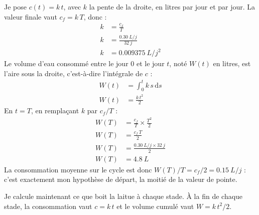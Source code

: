 \begin{demonstration}
Je pose $c(t) = k\,t$, avec $k$ la pente de la droite, en litres par jour et par jour. La valeur finale vaut $c_f = k\,T$, donc :
\begin{align*}
k &= \frac{c_f}{T}\\
k &= \frac{\qty{0,30}{L/j}}{\qty{32}{j}}\\
k &= \qty{0,009375}{L/j^2}
\end{align*}
Le volume d'eau consommé entre le jour $0$ et le jour $t$, noté $W(t)$ en litres, est l'aire sous la droite, c'est-à-dire l'intégrale de $c$ :
\begin{align*}
W(t) &= \int_0^{t} k\,s\,\mathrm{d}s\\
W(t) &= \frac{k\,t^{2}}{2}
\end{align*}
En $t = T$, en remplaçant $k$ par $c_f/T$ :
\begin{align*}
W(T) &= \frac{c_f}{T}\times\frac{T^{2}}{2}\\
W(T) &= \frac{c_f\,T}{2}\\
W(T) &= \frac{\qty{0,30}{L/j}\times\qty{32}{j}}{2}\\
W(T) &= \qty{4,8}{L}
\end{align*}
La consommation moyenne sur le cycle est donc $W(T)/T = c_f/2 = \qty{0,15}{L/j}$ : c'est exactement mon hypothèse de départ, la moitié de la valeur de pointe.
\end{demonstration}

Je calcule maintenant ce que boit la laitue à chaque stade. À la fin de chaque stade, la consommation vaut $c = k\,t$ et le volume cumulé vaut $W = k\,t^{2}/2$.

